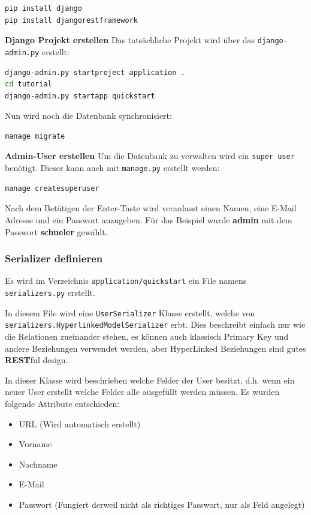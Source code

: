 \begin{lstlisting}[language=bash]
pip install django
pip install djangorestframework
\end{lstlisting}

\textbf{Django Projekt erstellen}
Das tatsächliche Projekt wird über das \verb|django-admin.py| erstellt:

\begin{lstlisting}[language=bash]
django-admin.py startproject application .
cd tutorial
django-admin.py startapp quickstart
\end{lstlisting}

Nun wird noch die Datenbank synchronisiert:

\begin{lstlisting}[language=bash]
manage migrate
\end{lstlisting}

\textbf{Admin-User erstellen}
Um die Datenbank zu verwalten wird ein \verb|super user| benötigt. Dieser kann auch mit \verb|manage.py| erstellt werden:

\begin{lstlisting}[language=bash]
manage createsuperuser
\end{lstlisting}

Nach dem Betätigen der Enter-Taste wird veranlasst einen Namen, eine E-Mail Adresse und ein Passwort anzugeben. Für das Beispiel wurde \textbf{admin} mit dem Passwort \textbf{schueler} gewählt.

\subsubsection{Serializer definieren}
Es wird im Verzeichnis \verb|application/quickstart| ein File namens \verb|serializers.py| erstellt.

In diesem File wird eine \verb|UserSerializer| Klasse erstellt, welche von \\ \verb|serializers.HyperlinkedModelSerializer| erbt. Dies beschreibt einfach nur wie die Relationen zueinander stehen, es können auch klassisch Primary Key und andere Beziehungen verwendet werden, aber HyperLinked Beziehungen sind gutes \textbf{REST}ful design.

In dieser Klasse wird beschrieben welche Felder der User besitzt, d.h. wenn ein neuer User erstellt welche Felder alle ausgefüllt werden müssen. Es wurden folgende Attribute entschieden:

\begin{itemize}
	\item URL (Wird automatisch erstellt)
	\item Vorname
	\item Nachname
	\item E-Mail
	\item Passwort (Fungiert derweil nicht als richtiges Passwort, nur als Feld angelegt)
\end{itemize}

